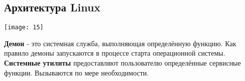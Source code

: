 \documentclass[a4paper]{article}
\begin{document}
\subsection{Архитектура Linux}
\begin{center}
        \texttt{[image: 15]}
\end{center}
\textbf{Демон}  - это системная служба, выполняющая определённую функцию. Как правило демоны запускаются в процессе старта операционной системы.\\
\textbf{Системные утилиты} предоставляют пользователю определённые сервисные функции. Вызываются по мере необходимости. 
\end{document}

